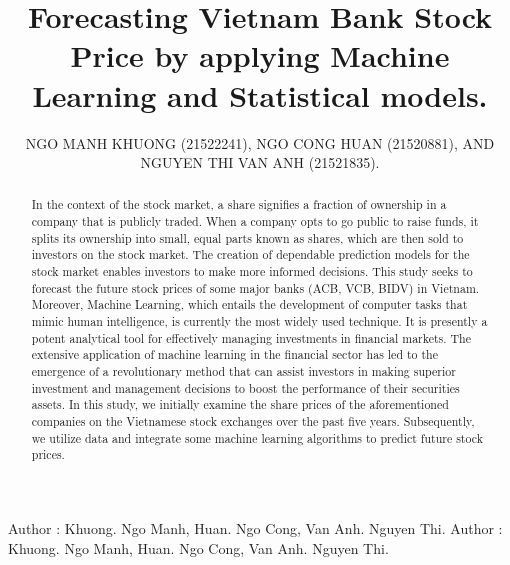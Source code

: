 \documentclass{ieeeojies}
\begin{document}
\title{Forecasting Vietnam Bank Stock Price by applying Machine Learning and Statistical models.}
\author{\uppercase{Ngo Manh Khuong (21522241)}, 
\uppercase{Ngo Cong Huan (21520881), and Nguyen Thi Van Anh (21521835)}.
}
\address[1]{University of Information Technology, Ho Chi Minh city (email: 21522241@gm.uit.edu.vn)}
\address[2]{University of Information Technology, Ho Chi Minh city (email: 21520881@gm.uit.edu.vn)}
\address[3]{University of Information Technology, Ho Chi Minh city (email: 21521835@gm.uit.edu.vn)}


\markboth
{Author \headeretal: Khuong. Ngo Manh, Huan. Ngo Cong, Van Anh. Nguyen Thi.}
{Author \headeretal: Khuong. Ngo Manh, Huan. Ngo Cong, Van Anh. Nguyen Thi.}

\corresp{}

\begin{abstract}
In the context of the stock market, a share signifies a fraction of ownership in a company that is publicly traded. When a company opts to go public to raise funds, it splits its ownership into small, equal parts known as shares, which are then sold to investors on the stock market. The creation of dependable prediction models for the stock market enables investors to make more informed decisions. This study seeks to forecast the future stock prices of some major banks (ACB, VCB, BIDV) in Vietnam. Moreover, Machine Learning, which entails the development of computer tasks that mimic human intelligence, is currently the most widely used technique. It is presently a potent analytical tool for effectively managing investments in financial markets. The extensive application of machine learning in the financial sector has led to the emergence of a revolutionary method that can assist investors in making superior investment and management decisions to boost the performance of their securities assets. In this study, we initially examine the share prices of the aforementioned companies on the Vietnamese stock exchanges over the past five years. Subsequently, we utilize data and integrate some machine learning algorithms to predict future stock prices.
\end{abstract}
\end{document}
